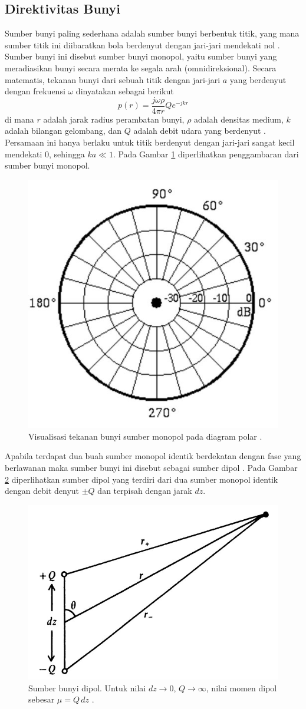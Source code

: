 \subsection{Direktivitas Bunyi}
Sumber bunyi paling sederhana adalah sumber bunyi berbentuk titik, yang mana sumber titik ini diibaratkan bola berdenyut dengan jari-jari mendekati nol \cite{bukuFletcher}. Sumber bunyi ini disebut sumber bunyi monopol, yaitu sumber bunyi yang meradiasikan bunyi secara merata ke segala arah (omnidireksional). Secara matematis, tekanan bunyi dari sebuah titik dengan jari-jari $a$ yang berdenyut dengan frekuensi $\omega$ dinyatakan sebagai berikut
\begin{equation}
    p(r)=\frac{j\omega \rho}{4 \pi r}Qe^{-jkr}
    \label{eq:monopol}
\end{equation}
di mana $r$ adalah jarak radius perambatan bunyi, $\rho$ adalah densitas medium, $k$ adalah bilangan gelombang, dan $Q$ adalah debit udara yang berdenyut \cite{bukuFletcher}. Persamaan ini hanya berlaku untuk titik berdenyut dengan jari-jari sangat kecil mendekati 0, sehingga $ka \ll 1$. Pada Gambar \ref{fig:monopol} diperlihatkan penggambaran dari sumber bunyi monopol. \par
\begin{figure}[t!]
    \centering
    \includegraphics[width=5 cm]{Gambar/monopol.jpg}
    \caption{Visualisasi tekanan bunyi sumber monopol pada diagram polar \cite{danRussel-pole}.}
    \label{fig:monopol}
\end{figure}
Apabila terdapat dua buah sumber monopol identik berdekatan dengan fase yang berlawanan maka sumber bunyi ini disebut sebagai sumber dipol \cite{bukuFletcher}. Pada Gambar \ref{fig:dipol-dobelMonopol} diperlihatkan sumber dipol yang terdiri dari dua sumber monopol identik dengan debit denyut $\pm Q$ dan terpisah dengan jarak $dz$.
\begin{figure}[t!]
    \centering
    \includegraphics[width = 8 cm]{Gambar/dipol-dobelMonopol.jpg}
    \caption{Sumber bunyi dipol. Untuk nilai $dz \rightarrow 0$, $Q \rightarrow \infty$, nilai momen dipol sebesar $\mu = Q \, dz$ \cite{bukuFletcher}.}
    \label{fig:dipol-dobelMonopol}
\end{figure}

